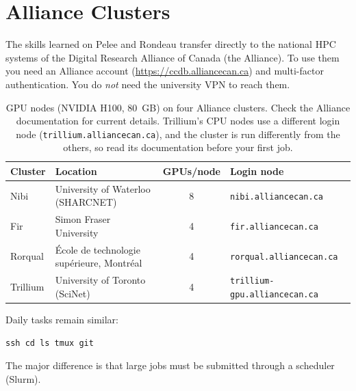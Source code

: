 \section{Alliance Clusters}
\label{app:alliance}

The skills learned on Pelee and Rondeau transfer directly to the national HPC systems of the
Digital Research Alliance of Canada (the Alliance). To use them you need an Alliance account
(\url{https://ccdb.alliancecan.ca}) and multi-factor authentication. You do \emph{not} need the
university VPN to reach them.

\begin{table}[h]
\centering\small
\begin{tabular}{@{}lp{}cl@{}}
\toprule
\textbf{Cluster} & \textbf{Location} & \textbf{GPUs/node} & \textbf{Login node} \\
\midrule
Nibi     & University of Waterloo (SHARCNET)         & 8 & \texttt{nibi.alliancecan.ca} \\
Fir      & Simon Fraser University                   & 4 & \texttt{fir.alliancecan.ca} \\
Rorqual  & École de technologie supérieure, Montréal & 4 & \texttt{rorqual.alliancecan.ca} \\
Trillium & University of Toronto (SciNet)            & 4 & \texttt{trillium-gpu.alliancecan.ca} \\
\bottomrule
\end{tabular}
\caption{GPU nodes (NVIDIA H100, 80~GB) on four Alliance clusters. Check the Alliance
documentation for current details. Trillium's CPU nodes use a different login node
(\texttt{trillium.alliancecan.ca}), and the cluster is run differently from the others, so read
its documentation before your first job.}
\end{table}

Daily tasks remain similar:

\begin{lstlisting}
ssh cd ls tmux git
\end{lstlisting}

The major difference is that large jobs must be submitted through a scheduler (Slurm).